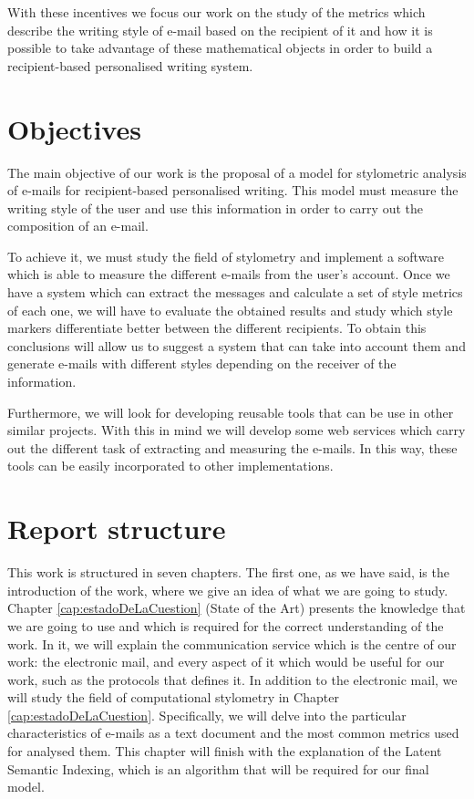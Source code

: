 With these incentives we focus our work on the study of the metrics which describe the writing style of e-mail based on the recipient of it and how it is possible to take advantage of these mathematical objects in order to build a recipient-based personalised writing system.

\section{Objectives}\label{sect:obj}
The main objective of our work is the proposal of a model for stylometric analysis of e-mails for recipient-based personalised writing. This model must measure the writing style of the user and use this information in order to carry out the composition of an e-mail.

To achieve it, we must study the field of stylometry and implement a software which is able to measure the different e-mails from the user's account. Once we have a system which can extract the messages and calculate a set of style metrics of each one, we will have to evaluate the obtained results and study which style markers differentiate better between the different recipients. To obtain this conclusions will allow us to suggest a system that can take into account them and generate e-mails with different styles depending on the receiver of the information.

Furthermore, we will look for developing reusable tools that can be use in other similar projects. With this in mind we will develop some web services which carry out the different task of extracting and measuring the e-mails. In this way, these tools can be easily incorporated to other implementations.

\section{Report structure}\label{sect:structure}
This work is structured in seven chapters. The first one, as we have said, is the introduction of the work, where we give an idea of what we are going to study. Chapter \ref{cap:estadoDeLaCuestion} (State of the Art) presents the knowledge that we are going to use and which is required for the correct understanding of the work. In it, we will explain the communication service which is the centre of our work: the electronic mail, and every aspect of it  which would be useful for our work, such as the protocols that defines it. In addition to the electronic mail, we will study the field of computational stylometry in Chapter \ref{cap:estadoDeLaCuestion}. Specifically, we will delve into the particular characteristics of e-mails as a text document and the most common metrics used for analysed them. This chapter will finish with the explanation of the Latent Semantic Indexing, which is an algorithm that will be required for our final model.

